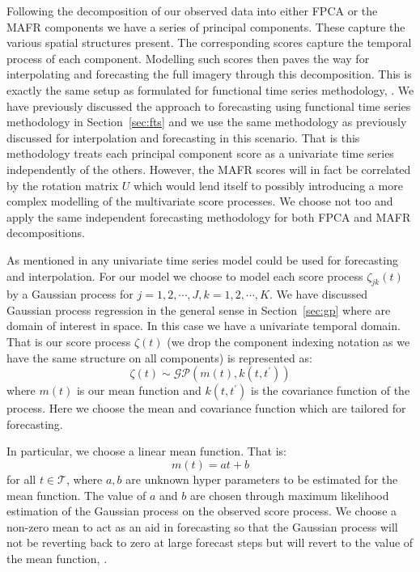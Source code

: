Following the decomposition of our observed data into either FPCA or the MAFR components we have a series of principal components. 
These capture the various spatial structures present.
The corresponding scores capture the temporal process of each component.
Modelling such scores then paves the way for interpolating and forecasting the full imagery through this decomposition.
This is exactly the same setup as formulated for functional time series methodology, \citep{hyndman_forecasting_2009}.
We have previously discussed the approach to forecasting using functional time series methodology in Section~\ref{sec:fts} and we use the same methodology as previously discussed for interpolation and forecasting in this scenario.
That is this methodology treats each principal component score as a univariate time series independently of the others.
However, the MAFR scores will in fact be correlated by the rotation matrix $U$ which would lend itself to possibly introducing a more complex modelling of the multivariate score processes.
We choose not too and apply the same independent forecasting methodology for both FPCA and MAFR decompositions. 

As mentioned in \citep{hyndman_forecasting_2009} any univariate time series model could be used for forecasting and interpolation. 
For our model we choose to model each score process $\zeta_{jk}(t)$ by a Gaussian process for $j=1,2,\cdots, J, k=1,2,\cdots,K$.
We have discussed Gaussian process regression in the general sense in Section~\ref{sec:gp} where are domain of interest in space.
In this case we have a univariate temporal domain. 
That is our score process $\zeta(t)$ (we drop the component indexing notation as we have the same structure on all components) is represented as:
\begin{equation}
	\zeta(t) \sim \mathcal{GP}\left( m(t), k(t, t^\prime)\right)
\end{equation}
where $m(t)$ is our mean function and $k(t, t^\prime)$ is the covariance function of the process.
Here we choose the mean and covariance function which are tailored for forecasting.

In particular, we choose a linear mean function.
That is:
\begin{equation}
	m(t) = at + b
\end{equation}
for all $t \in \mathcal{T}$, where $a, b$ are unknown hyper parameters to be estimated for the mean function.
The value of $a$ and $b$ are chosen through maximum likelihood estimation of the Gaussian process on the observed score process. 
We choose a non-zero mean to act as an aid in forecasting so that the Gaussian process will not be reverting back to zero at large forecast steps but will revert to the value of the mean function, \citep{williams_gaussian_2006}. 

